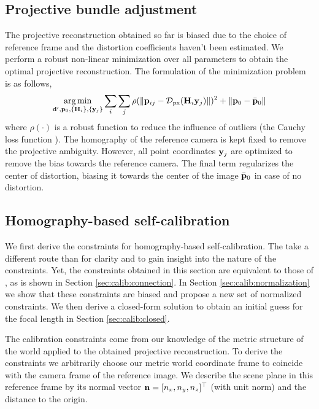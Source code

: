 \documentclass[10pt,twocolumn,letterpaper]{article}
\begin{document}
\subsection{Projective bundle adjustment}
\label{sec:projective:ba}

The projective reconstruction obtained so far is biased due to the choice of reference frame and the distortion coefficients haven't been estimated. We perform a robust non-linear minimization \cite{ceres-solver} over all parameters to obtain the optimal projective reconstruction. The formulation of the minimization problem is as follows, 
%
\begin{align}
\argmin_{\dv',\pv_0,\lbrace \Hm_i \rbrace, \lbrace \yv_j \rbrace} 
%
\sum_i \sum_j \rho(\norm{\pv_{ij} - \Distortion_{\text{px}}(\Hm_i \yv_j)})^2 + \norm{\pv_0 - \bar{\pv}_0}
\end{align}
%
where $\rho(\cdot)$ is a robust function to reduce the influence of outliers (\eg the Cauchy loss function \cite{ceres-solver}). The homography of the reference camera is kept fixed to remove the projective ambiguity. However, all point coordinates $\mathbf{y}_j$ are optimized to remove the bias towards the reference camera. The final term regularizes the center of distortion, biasing it towards the center of the image $\bar{\mathbf{p}}_0$ in case of no distortion.

\subsection{Homography-based self-calibration}

We first derive the constraints for homography-based self-calibration. The take a different route than \cite{bocquillon2006} for clarity and to gain insight into the nature of the constraints. Yet, the constraints obtained in this section are equivalent to those of \cite{bocquillon2006}, as is shown in Section \ref{sec:calib:connection}. In Section \ref{sec:calib:normalization} we show that these constraints are biased and propose a new set of normalized constraints. We then derive a closed-form solution to obtain an initial guess for the focal length in Section \ref{sec:calib:closed}.

The calibration constraints come from our knowledge of the metric structure of the world applied to the obtained projective reconstruction. To derive the constraints we arbitrarily choose our metric world coordinate frame to coincide with the camera frame of the reference image. We describe the scene plane in this reference frame by its normal vector $\mathbf{n}=[n_x,n_y,n_z]^\top$ (with unit norm) and the distance to the origin.
\end{document}
